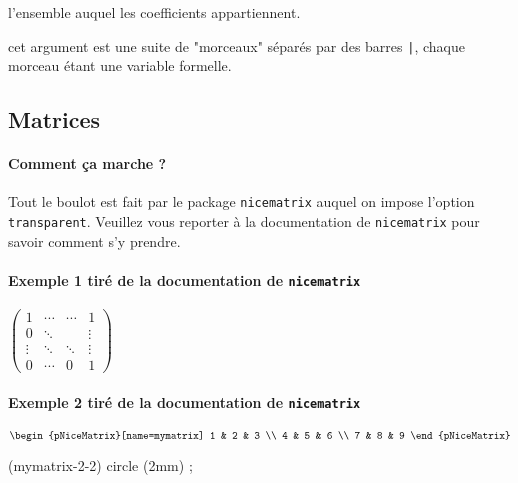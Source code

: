\documentclass[12pt,a4paper]{article}
\theoremstyle{definition}
\begin{document}

 l'ensemble auquel les coefficients appartiennent.

 cet argument est une suite de "morceaux" séparés par des barres \verb+|+, chaque morceau étant une variable formelle.





\subsection{Matrices}

\paragraph{Comment ça marche ?}

Tout le boulot est fait par le package \verb+nicematrix+ auquel on impose l'option \verb+transparent+. Veuillez vous reporter à la documentation de \verb+nicematrix+ pour savoir comment s'y prendre.


\paragraph{Exemple 1 tiré de la documentation de \texttt{nicematrix}}

\begin{tcblisting}{}
$\begin{pmatrix}
    1      & \cdots & \cdots & 1      \\
    0      & \ddots &        & \vdots \\
    \vdots & \ddots & \ddots & \vdots \\
    0      & \cdots & 0      & 1
\end{pmatrix}$
\end{tcblisting}


\paragraph{Exemple 2 tiré de la documentation de \texttt{nicematrix}}

\begin{tcblisting}{}
$\begin{pNiceMatrix}[name=mymatrix]
    1 & 2 & 3 \\
    4 & 5 & 6 \\
    7 & 8 & 9
\end{pNiceMatrix}$

\draw (mymatrix-2-2) circle (2mm) ;
\end{tcblisting}
\end{document}
